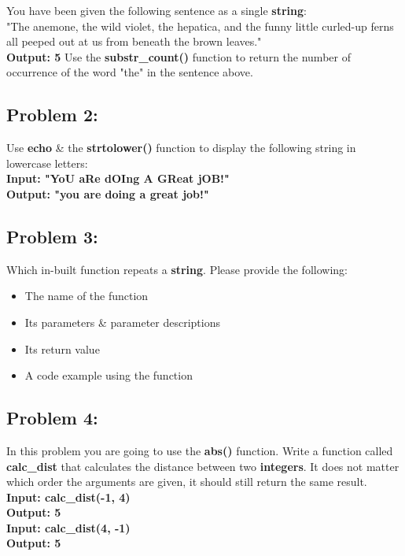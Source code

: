 \documentclass{article}
\begin{document}
You have been given the following sentence as a single \textbf{string}: \\

"The anemone, the wild violet, the hepatica, and the funny little curled-up ferns all peeped out at us from beneath the brown leaves." \\

\textbf{Output: 5} 
Use the \textbf{substr\_count()} function to return the number of occurrence of the word "the" in the sentence above.

\subsection*{Problem 2:}
Use \textbf{echo} \& the \textbf{strtolower()} function to display the following string in lowercase letters: \\

\textbf{Input: "YoU aRe dOIng A GReat jOB!"} \\
\textbf{Output: "you are doing a great job!"}

\subsection*{Problem 3:}
Which in-built function repeats a \textbf{string}. Please provide the following:
\begin{itemize}
    \item The name of the function
    \item Its parameters \& parameter descriptions
    \item Its return value
    \item A code example using the function
\end{itemize}

\subsection*{Problem 4:}
In this problem you are going to use the \textbf{abs()} function. Write a function called \textbf{calc\_dist} that calculates the distance between two \textbf{integers}. It does not matter which order the arguments are given, it should still return the same result. \\

\textbf{Input: calc\_dist(-1, 4)} \\
\textbf{Output: 5} \\

\textbf{Input: calc\_dist(4, -1)} \\
\textbf{Output: 5} 
\end{document}
